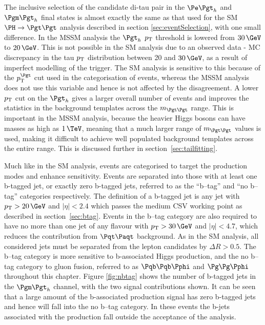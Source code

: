 The inclusive selection of the candidate di-tau pair in the $\etau$ and $\mutau$
final states is almost exactly the same
as that used for the \ac{SM} $\HToTauTau$ analysis described in section
\ref{sec:eventSelection}, with one small difference. In the \ac{MSSM} analysis
the $\Pgth$ $p_{\mathrm{T}}$ threshold is lowered from $30\,\GeV$ to $20\,\GeV$. This is
not possible in the \ac{SM} analysis due to an observed data - \ac{MC}
discrepancy in the tau $p_{\mathrm{T}}$ distribution between 20 and $30\,\GeV$, 
as a result of imperfect modelling of the trigger. 
The \ac{SM} analysis is sensitive to this because of the $\pt^{\Pgt}$ cut used in the
categorisation of events, whereas the \ac{MSSM} analysis does not use this
variable and hence is not affected by the disagreement. 
A lower $p_{\mathrm{T}}$ cut on the $\Pgth$ gives a larger overall number of events
and improves the statistics in the background templates across the
$m_{\Pgt\Pgt}$ range. This is important in the \ac{MSSM} analysis, because the 
heavier Higgs bosons can have masses as high as $1\,\TeV$,
meaning that a much larger range of $m_{\Pgt\Pgt}$ values is used, making it
difficult to achieve well populated background templates across the entire range.
This is discussed further in section~\ref{sec:tailfitting}.

Much like in the \ac{SM} analysis, events are categorised to target the
production modes and enhance sensitivity. Events are separated into those with at least one b-tagged jet, or exactly
zero b-tagged jets, referred to as the ``b--tag'' and ``no b--tag'' categories
respectively. The definition of a b-tagged jet is any jet with
$\pt > 20\,\GeV$ and $|\eta| < 2.4$ which passes the medium \ac{CSV} working
point as described in section~\ref{sec:btag}. Events in the b--tag category are also required to have no more
than one jet of any flavour with $\pt>30\,\GeV$ and $|\eta|<4.7$, which reduces the contribution
from $\ttbar$ background. As in the \ac{SM} analysis, all considered jets must
be separated from the lepton candidates by $\Delta R > 0.5$. The b--tag
category is more sensitive to b-associated Higgs production, and the no b--tag
category to gluon fusion, referred to as $\Pqb\Pqb\Pphi$ and $\Pg\Pg\Pphi$ throughout
this chapter. Figure \ref{fig:nbtag} shows the number of b-tagged jets in the
$\mutau$ channel, with the two signal contributions shown. It can be seen
that a large amount of the b-associated production signal has zero b-tagged jets
and hence will fall into the no b--tag category. In these events the b-jets
associated with the production fall outside the acceptance of the analysis.

